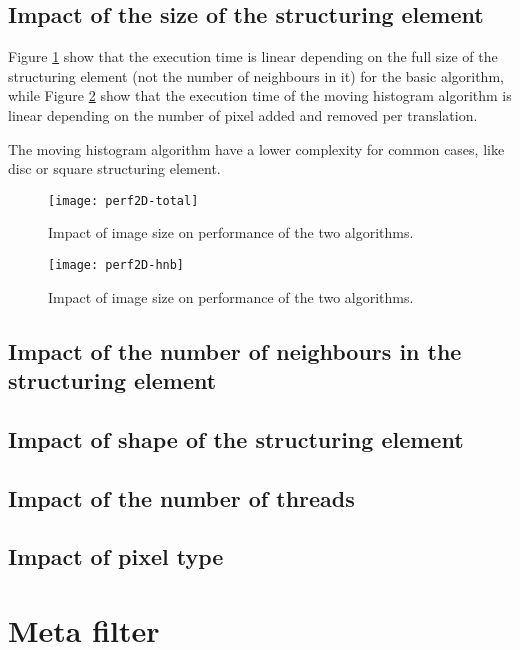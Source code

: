 \documentclass{InsightArticle}
\begin{document}
  \subsection{Impact of the size of the structuring element}

Figure \ref{perf2D-total} show that the execution time is linear depending on
the full size of the structuring element (not the number of neighbours in it)
for the basic algorithm, while Figure \ref{perf2D-hnb} show that the execution
time of the moving histogram algorithm is linear depending on the number of
pixel added and removed per translation.

The moving histogram algorithm have a lower complexity for common cases, like
disc or square structuring element.

\begin{figure}[htbp]
\centering
\texttt{[image: perf2D-total]}
\caption{Impact of image size on performance of the two algorithms.\label{perf2D-total}}
\end{figure}

\begin{figure}[htbp]
\centering
\texttt{[image: perf2D-hnb]}
\caption{Impact of image size on performance of the two algorithms.\label{perf2D-hnb}}
\end{figure}

  \subsection{Impact of the number of neighbours in the structuring element}

  \subsection{Impact of shape of the structuring element}

  \subsection{Impact of the number of threads}

  \subsection{Impact of pixel type}

\section{Meta filter}
\end{document}
